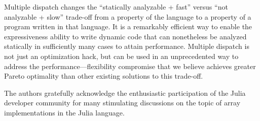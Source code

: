 \documentclass[preprint]{sigplanconf}
\begin{document}
Multiple dispatch changes the ``statically analyzable + fast'' versus ``not
analyzable + slow'' trade-off from a property of the language to a property of
a program written in that language. It is a remarkably efficient way to enable
the expressiveness ability to write dynamic code that can nonetheless be
analyzed statically in sufficiently many cases to attain performance. Multiple
dispatch is not just an optimization hack, but can be used in an unprecedented
way to address the performance---flexibility compromise that we believe
achieves greater Pareto optimality than other existing solutions to this
trade-off.

%

\acks

The authors gratefully acknowledge the enthusiastic participation of the Julia
developer community for many stimulating discussions on the topic of array
implementations in the Julia language.



{}





\end{document}
